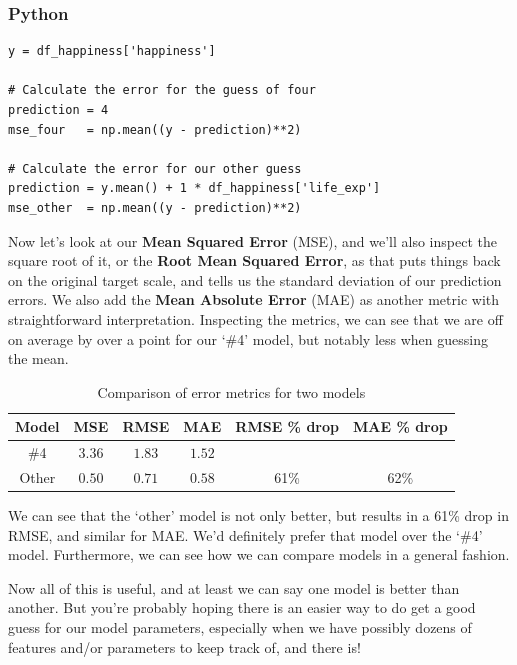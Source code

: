 \documentclass[
  letterpaper,
]{krantz}
\begin{document}
\subsubsection{Python}

\begin{verbatim}
y = df_happiness['happiness']

# Calculate the error for the guess of four
prediction = 4
mse_four   = np.mean((y - prediction)**2)

# Calculate the error for our other guess
prediction = y.mean() + 1 * df_happiness['life_exp']
mse_other  = np.mean((y - prediction)**2)
\end{verbatim}

Now let's look at our \textbf{Mean Squared Error} (MSE), and we'll also
inspect the square root of it, or the \textbf{Root Mean Squared Error},
as that puts things back on the original target scale, and tells us the
standard deviation of our prediction errors. We also add the
\textbf{Mean Absolute Error} (MAE) as another metric with
straightforward interpretation. Inspecting the metrics, we can see that
we are off on average by over a point for our `\#4' model, but notably
less when guessing the mean.

\begin{longtable}{cccccc}
\caption{Comparison of error metrics for two models}\tabularnewline

\toprule
Model & MSE & RMSE & MAE & RMSE \% drop & MAE \% drop \\ 
\midrule\addlinespace[2.5pt]
\#4 & \textcolor[HTML]{404040}{$3.36$} & \textcolor[HTML]{404040}{$1.83$} & \textcolor[HTML]{404040}{$1.52$} &  &  \\ 
Other & \textcolor[HTML]{404040}{$0.50$} & \textcolor[HTML]{404040}{$0.71$} & \textcolor[HTML]{404040}{$0.58$} & 61\% & 62\% \\ 
\bottomrule
\end{longtable}

We can see that the `other' model is not only better, but results in a
61\% drop in RMSE, and similar for MAE. We'd definitely prefer that
model over the `\#4' model. Furthermore, we can see how we can compare
models in a general fashion.

Now all of this is useful, and at least we can say one model is better
than another. But you're probably hoping there is an easier way to do
get a good guess for our model parameters, especially when we have
possibly dozens of features and/or parameters to keep track of, and
there is!
\end{document}
